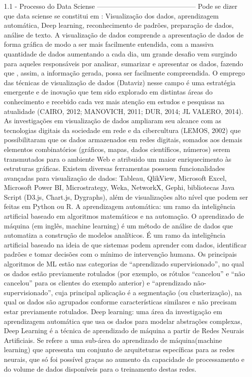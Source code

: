 1.1 - Processo do Data Sciense
--------------------------------------------
Pode se dizer que data sciense se constitui em :  Visualização dos dados,  aprendizagem automática,  Deep learning,  reconhecimento de padrões, preparação de dados, análise de texto.
 A  visualização de dados comprende a apresentação de dados de forma gráfica de modo a ser mais facilmente entendida, com a massiva quantidade de dados aumentando a cada dia, um grande desafio vem surgindo para aqueles responsáveis por analisar, sumarizar e apresentar os dados, fazendo que , assim, a informação gerada, possa ser facilmente compreendida. O emprego das técnicas de visualização de dados (Dataviz) nesse campo é uma estratégia emergente e de inovação que tem sido explorado em distintas áreas do conhecimento e recebido cada vez mais atenção em estudos e pesquisas na atualidade (CAIRO, 2012; MANOVICH, 2011; DUR, 2014; JL VALERO, 2014).  As investigações em visualização de dados ampliaram seu alcance com as tecnologias digitais da sociedade em rede e da cibercultura (LEMOS, 2002) que possibilitaram que os dados  armazenados em redes digitais, somados aos demais elementos combinatórios (gráficos, mapas, dados científicos, números) serem transmutados para o ambiente Web e atribuido um maior enriquecimento às estruturas gráficas. Existem diversas ferramentas possuem funcionalidades avançadas para visualização de dados: Tableau, QlikView, Microsoft Excel, Microsoft Power BI, Microstrategy, Weka, NetworkX, Gephi, bibliotecas Java Script (D3.js, Chart.js, Dygraphs), além de visualizações alto nível que podem ser feitas em Python ou R.
 A aprendizagem automática: um ramo da inteligência artificial baseado em algoritmos matemáticos e na automação. O aprendizado de máquina (em inglês, machine learning) é um método de análise de dados que automatiza a construção de modelos analíticos. É um ramo da inteligência artificial baseado na ideia de que sistemas podem aprender com dados, identificar padrões e tomar decisões com o mínimo de intervenção humana. Os principais algoritmos de ML estão nas categorias de “aprendizado supervisionado”, no qual os dados estão previamente rotulados (por exemplo, os rótulos “cancelou” e “não cancelou” para os clientes do exemplo anterior) e “aprendizado não-supervisionado”, cuja principal aplicação é a segmentação (ou clusterização), na qual os dados são agrupados conforme características similares e não precisam estar previamente rotulados.
 Deep learning: uma área da investigação em aprendizagem automática que usa os dados para modelar abstrações complexas, Deep Learning é a técnica de aprendizado de máquina a partir de Redes Neurais Artificiais. Se refere a uma sub-área do aprendizado de máquina(machine learning) que apresenta um conjunto de arquiteturas específicas para as redes neurais, que só foi possível graças ao aumento da capacidade de processamento e do volume de dados disponíveis para o treinamento destas redes.
